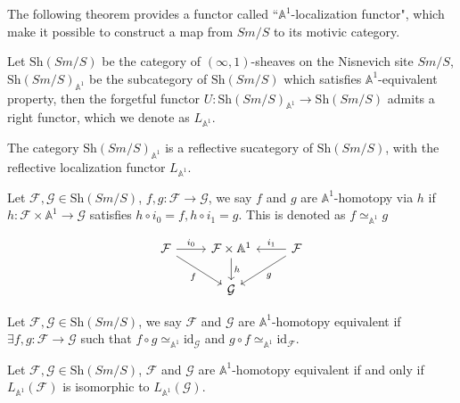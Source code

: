 The following theorem provides a functor called ``$\mathbb{A}^1$-localization functor", which make it possible to construct a map from $Sm/S$ to its motivic category.

\begin{theorem}\cite{morel2012a1} \label{localization}
    Let $\text{Sh}(Sm/S)$ be the category of $(\infty,1)$-sheaves on the Nisnevich site $Sm/S$, $\text{Sh}(Sm/S)_{\mathbb{A}^1}$ be the subcategory of $\text{Sh}(Sm/S)$ which satisfies $\mathbb{A}^1$-equivalent property, then the forgetful functor $U:\text{Sh}(Sm/S)_{\mathbb{A}^1}\to \text{Sh}(Sm/S)$ admits a right functor, which we denote as $L_{\mathbb{A}^1}$.
\end{theorem}

\begin{corollary}
    The category $\text{Sh}(Sm/S)_{\mathbb{A}^1}$ is a reflective sucategory of $\text{Sh}(Sm/S)$, with the reflective localization functor $L_{\mathbb{A}^1}$.
\end{corollary}

\begin{definition}
    Let $\mathcal{F},\mathcal{G} \in \text{Sh}(Sm/S)$,  $f,g: \mathcal{F}\to \mathcal{G}$, we say $f$ and $g$ are $\mathbb{A}^1$-homotopy via $h$ if $h: \mathcal{F}\times{\mathbb{A}^1\to \mathcal{G}}$ satisfies $h\circ i_0=f,h\circ i_1 =g$. This is denoted as $f\simeq_{\mathbb{A}^1}g$
\end{definition}
\[
\begin{tikzcd}
\mathcal{F} \ar[r, "i_0"] \ar[rd, "f"'] & \mathcal{F} \times \mathbb{A}^1 \ar[d, "h"] & \mathcal{F} \ar[l, "i_1"'] \ar[ld, "g"] \\
& \mathcal{G} &
\end{tikzcd}
\]

\begin{definition}
    Let $\mathcal{F},\mathcal{G} \in \text{Sh}(Sm/S)$, we say  $\mathcal{F}$ and $\mathcal{G}$ are $\mathbb{A}^1$-homotopy equivalent if $\exists f, g: \mathcal{F}\to \mathcal{G}$ such that $f\circ g \simeq_{\mathbb{A}^1} \text{id}_{\mathcal{G}}$ and $g\circ f \simeq_{\mathbb{A}^1} \text{id}_{\mathcal{F}}$.
\end{definition}

\begin{proposition}
  Let $\mathcal{F},\mathcal{G} \in \text{Sh}(Sm/S)$, $\mathcal{F}$ and $\mathcal{G}$ are $\mathbb{A}^1$-homotopy equivalent if and only if $L_{\mathbb{A}^1}(\mathcal{F})$ is isomorphic to $L_{\mathbb{A}^1}(\mathcal{G})$.
\end{proposition}


